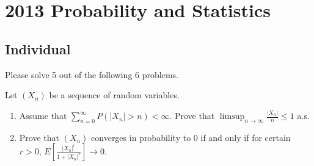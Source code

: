 \section{2013 Probability and Statistics}

\subsection{Individual}
Please solve 5 out of the following 6 problems.

\begin{exercise}
\label{probability:2013:1}
Let $(X_n)$ be a sequence of random variables.
\begin{enumerate}
    \item Assume that $\sum_{n=0}^\infty P(|X_n| > n) < \infty$. Prove that $\limsup_{n\to\infty} \frac{|X_n|}{n} \leq 1$ a.s.
    \item Prove that $(X_n)$ converges in probability to 0 if and only if for certain $r > 0$, $E\left[\frac{|X_n|^r}{1+|X_n|^r}\right] \to 0$.
\end{enumerate}
\end{exercise}

